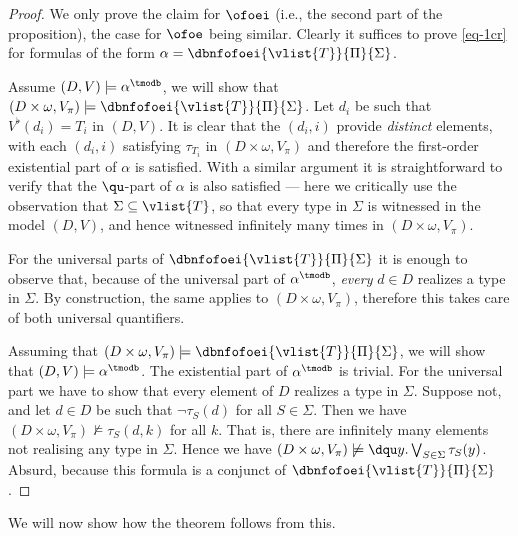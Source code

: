 \begin{proof}
We only prove the claim for $\ofoei$ (i.e., the second part of the proposition),
the case for $\ofoe$ being similar.
Clearly it suffices to prove \eqref{eq-1cr} for formulas of the form
$\alpha = \dbnfofoei{\vlist{T}}{\Pi}{\Sigma}$.
\smallskip

\noindent\fbox{$\Rightarrow$} 
Assume $(D, V) \models \alpha^{\tmodb}$, we will show that 
$(D\times \omega, V_\pi) \models \dbnfofoei{\vlist{T}}{\Pi}{\Sigma}$.
Let $d_i$ be such that $V^{\flat}(d_i) = T_{i}$ in $(D, V)$. 
It is clear that the $(d_i,i)$ provide \emph{distinct} elements, with each 
$(d_i,i)$ satisfying $\tau_{T_i}$ in $(D\times\omega, V_{\pi})$ and therefore 
the first-order existential part of $\alpha$ is satisfied. 
With a similar argument it is straightforward to verify that the $\qu$-part of 
$\alpha$ is also satisfied --- here we critically use the observation that
$\Sigma \subseteq \vlist{T}$, so that every type in $\Sigma$ is witnessed in 
the model $(D,V)$, and hence witnessed infinitely many times in $(D\times\omega,
V_\pi)$.

For the universal parts of $\dbnfofoei{\vlist{T}}{\Pi}{\Sigma}$ it is enough
to observe that, because of the universal part of $\alpha^\tmodb$, \emph{every}
$d\in D$ realizes a type in $\Sigma$. 
By construction, the same applies to $(D\times\omega, V_{\pi})$, 
therefore this takes care of both universal quantifiers.
\medskip
		
\noindent\fbox{$\Leftarrow$} 
Assuming that $(D\times \omega, V_\pi) \models 
\dbnfofoei{\vlist{T}}{\Pi}{\Sigma}$,
we will show that $(D, V) \models \alpha^\tmodb$. 
The existential part of $\alpha^{\tmodb}$ is trivial. 
For the universal part we have to show that every element of $D$ realizes a 
type in $\Sigma$. 
Suppose not, and let $d\in D$ be such that $\lnot\tau_S(d)$ for all $S\in 
\Sigma$. 
Then we have $(D\times\omega, V_\pi) \not\models \tau_S(d,k)$ for all $k$.
That is, there are infinitely many elements not realising any type in $\Sigma$. 
Hence we have $(D\times\omega, V_\pi) \not\models \dqu y.\bigvee_{S\in\Sigma} 
\tau_S(y)$. 
Absurd, because this formula is a conjunct of 
$\dbnfofoei{\vlist{T}}{\Pi}{\Sigma}$.
\end{proof}

\noindent
We will now show how the theorem follows from this.

